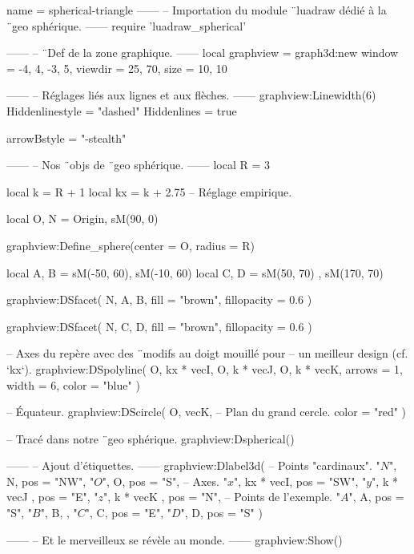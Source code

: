 \documentclass{standalone}
\begin{document}
\begin{luadraw}{name = spherical-triangle}
------
-- Importation du module ¨luadraw dédié à la ¨geo sphérique.
------
require 'luadraw_spherical'

------
-- ¨Def de la zone graphique.
------
local graphview = graph3d:new{
  window  = {-4, 4, -3, 5},
  viewdir = {25, 70},
  size    = {10, 10}
}

------
-- Réglages liés aux lignes et aux flèches.
------
graphview:Linewidth(6)
Hiddenlinestyle = "dashed"
Hiddenlines     = true

arrowBstyle = "-stealth"

------
-- Nos ¨objs de ¨geo sphérique.
------
local R =  3

local k  = R + 1
local kx = k + 2.75  -- Réglage empirique.

local O, N = Origin, sM(90, 0)

graphview:Define_sphere({center = O, radius = R})

local A, B = sM(-50, 60), sM(-10, 60)
local C, D = sM(50, 70) , sM(170, 70)

graphview:DSfacet(
  {N, A, B},
  {fill = "brown", fillopacity = 0.6}
)

graphview:DSfacet(
  {N, C, D},
  {fill = "brown", fillopacity = 0.6}
)

-- Axes du repère avec des ¨modifs au doigt mouillé pour
-- un meilleur design (cf. `kx`).
graphview:DSpolyline(
  {
    {O, kx * vecI},
    {O, k * vecJ},
    {O, k * vecK}},
    {arrows = 1, width = 6, color = "blue"}
)

-- Équateur.
graphview:DScircle(
  {O, vecK},       -- Plan du grand cercle.
  {color = "red"}
)

-- Tracé dans notre ¨geo sphérique.
graphview:Dspherical()

------
-- Ajout d'étiquettes.
------
graphview:Dlabel3d(
-- Points "cardinaux".
  "$N$", N, {pos = "NW"},
  "$O$", O, {pos = "S"},
-- Axes.
  "$x$", kx * vecI, {pos = "SW"},
  "$y$", k * vecJ , {pos = "E"},
  "$z$", k * vecK , {pos = "N"},
-- Points de l'exemple.
  "$A$", A, {pos = "S"},
  "$B$", B, {},
  "$C$", C, {pos = "E"},
  "$D$", D, {pos = "S"}
)

------
-- Et le merveilleux se révèle au monde.
------
graphview:Show()
\end{luadraw}
\end{document}
